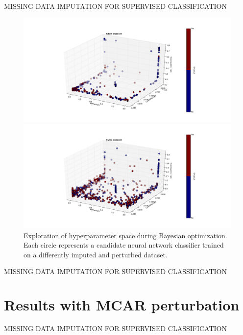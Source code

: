 \documentclass[10pt]{book}
\theoremstyle{definition}
\begin{document}
\clearpage
{}
{\hfill {\footnotesize\rm MISSING DATA IMPUTATION FOR SUPERVISED CLASSIFICATION} \hfill}

\begin{figure}[h!]
\includegraphics [scale=0.45, center]{../images/params3d_adult.png}\par
\includegraphics [scale=0.45, center]{../images/params3d_votes.png}\par
\caption{\footnotesize Exploration of hyperparameter space during Bayesian optimization. Each circle represents a candidate neural network classifier trained on a differently imputed and perturbed dataset.}
   \label{fig:params}
\end{figure}

\clearpage
{}
{\hfill {\footnotesize\rm MISSING DATA IMPUTATION FOR SUPERVISED CLASSIFICATION} \hfill}

\section{Results with MCAR perturbation}
\setcounter{equation}{0}

\clearpage
{}
{\hfill {\footnotesize\rm MISSING DATA IMPUTATION FOR SUPERVISED CLASSIFICATION} \hfill}
\end{document}
